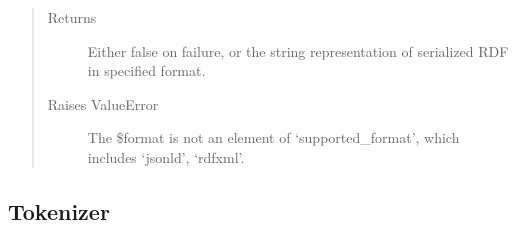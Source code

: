 \documentclass[letterpaper,10pt,english]{sphinxmanual}
\begin{document}
\begin{fulllineitems}
\begin{fulllineitems}
\begin{quote}
\begin{description}
\item[{Returns}] \leavevmode
Either false on failure, or the string representation of serialized RDF in specified format.

\item[{Raises ValueError}] \leavevmode
The \$format is not an element of `supported\_format', which includes `jsonld', `rdfxml'.

\end{description}\end{quote}

\end{fulllineitems}


\end{fulllineitems}



\subsection{Tokenizer}
\label{docs/api:tokenizer}
\end{document}
